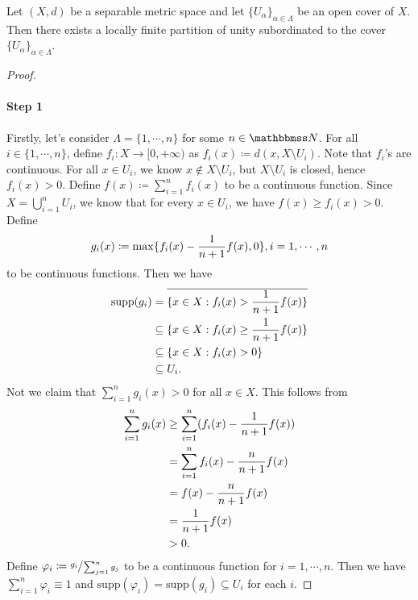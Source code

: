 \documentclass[screen,single]{techreport}
\numberwithin{equation}{section}
\begin{document}
\begin{theorem}\label{The:SeparMetricImplyLocFinPartiOfUnitySubord}
  Let $(X,d)$ be a separable metric space and let $\{U_\alpha\}_{\alpha \in \Lambda}$ be an open cover of $X$.
  Then there exists a locally finite partition of unity subordinated to the cover $\{U_\alpha\}_{\alpha \in \Lambda}$.
\end{theorem}
\begin{proof}\
  \paragraph{Step 1}
  Firstly, let's consider $\Lambda=\{1,\cdots,n\}$ for some $n \in \bbN$.
  For all $i \in \{1,\cdots,n\}$, define $f_i : X \to [0,+\infty)$ as $f_i(x) \coloneqq d(x, X \setminus U_i)$.
  Note that $f_i$'s are continuous.
  For all $x \in U_i$, we know $x \not\in X \setminus U_i$, but $X \setminus U_i$ is closed, hence $f_i(x) > 0$.
  Define $f(x) \coloneqq \sum_{i=1}^n f_i(x)$ to be a continuous function.
  Since $X = \bigcup_{i=1}^n U_i$, we know that for every $x \in U_i$, we have $f(x) \ge f_i(x) > 0$.
  Define
  \[
  g_i(x) \coloneqq \max\{ { f_i(x) - \frac{1}{n+1} f(x), 0} \}, i=1,\cdots,n
  \]
  to be continuous functions.
  Then we have
  \begin{align*}
    \mathrm{supp}(g_i) & = \overline{\{ {x \in X : f_i(x) > \frac{1}{n+1} f(x) } \}} \\
    & \subseteq \{ {x \in X: f_i(x) \ge \frac{1}{n+1} f(x) } \} \\
    & \subseteq \{ {x \in X: f_i(x) > 0 } \} \\
    & \subseteq U_i.
  \end{align*}
  Not we claim that $\sum_{i=1}^n g_i(x) > 0$ for all $x \in X$.
  This follows from
  \begin{align*}
    \sum_{i=1}^n g_i(x) & \ge \sum_{i=1}^n ({ f_i(x) - \frac{1}{n+1} f(x) }) \\ 
    & = \sum_{i=1}^n f_i(x) - \frac{n}{n+1} f(x) \\
    & = f(x) - \frac{n}{n+1} f(x) \\
    & = \frac{1}{n+1} f(x) \\
    & > 0.
  \end{align*}
  Define $\varphi_i \coloneqq \sfrac{g_i}{\sum_{j=1}^n g_j}$ to be a continuous function for $i=1,\cdots,n$.
  Then we have $\sum_{i=1}^n \varphi_i \equiv 1$ and $\mathrm{supp}(\varphi_i) = \mathrm{supp}(g_i) \subseteq U_i$ for each $i$.
  

\end{proof}
\end{document}
